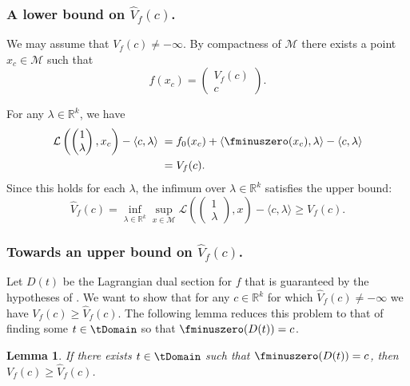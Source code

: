 \documentclass{article}
\numberwithin{equation}{section}
\newcommand{\R}{\mathbb{R}}
\newtheorem{lemma}{Lemma}[section]
\newcommand{\cM}{{\mathcal{M}}}
\newcommand{\Voptf}{V_{f}}
\begin{document}
 \subsubsection*{A lower bound on $\widehat{V}_f(c)$.}

 We may assume that $\Voptf(c) \neq -\infty$. 
 By compactness of $\cM$ there exists a point $x_c\in \cM$ such that
 \[
 f(x_c) = \begin{pmatrix} V_f(c) \\ c \end{pmatrix}.
 \]

For any $\lambda \in \R^k$, we have
\begin{align*}
\mathcal{L}\left(
    \begin{pmatrix} 1\\ \lambda\end{pmatrix}, x_c
    \right) 
    - \langle c, \lambda\rangle 
    \;=\;& f_0(x_c) + 
    \langle \fminuszero(x_c), \lambda\rangle 
    - 
    \langle c, \lambda\rangle \\
    \;=\;& V_f(c).
\end{align*}
Since this holds for each $\lambda$, the infimum over $\lambda\in\mathbb{R}^k$ satisfies the upper bound:
\[\widehat{V}_f(c)=
\inf_{\lambda \in \R^k} \sup_{x \in \cM} \mathcal{L}\left(\begin{pmatrix} 1\\ \lambda\end{pmatrix}, x\right) - \langle c, \lambda\rangle
\ge V_f(c).
\]

\subsubsection*{Towards an upper bound on $\widehat{V}_f(c)$.}


Let $D(t)$ be the Lagrangian dual section for $f$ that is guaranteed by the hypotheses of .
We want to show that for any $c\in\mathbb{R}^k$ for which $\widehat{V}_f(c) \neq -\infty$ we have $V_f(c) \ge \widehat{V}_f(c)$. The following lemma reduces this problem to that of finding some $t \in \tDomain$ so that $\fminuszero(D(t)) = c$.

\begin{lemma}
    
    If there exists $t\in\tDomain$ such that $\fminuszero(D(t))=c$,
    then $V_f(c) \ge \widehat{V}_f(c)$.
\end{lemma}
\end{document}
